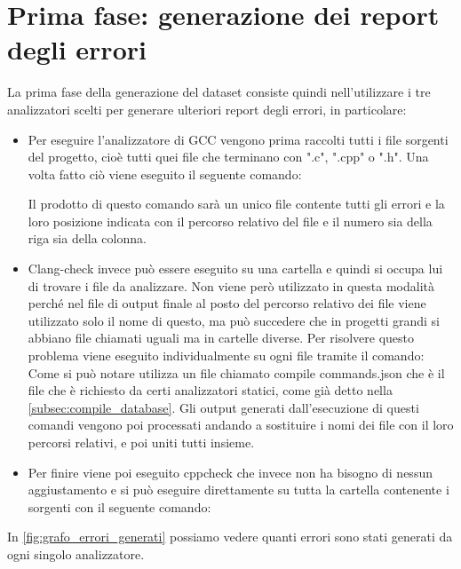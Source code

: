 \section{Prima fase: generazione dei report degli errori}
La prima fase della generazione del dataset consiste quindi nell'utilizzare i tre analizzatori scelti per generare ulteriori report degli errori, in particolare:
    \begin{itemize}
      \item Per eseguire l'analizzatore di GCC vengono prima raccolti tutti i file sorgenti del progetto, cioè tutti quei file che terminano con ".c", ".cpp" o ".h". Una volta fatto ciò viene eseguito il seguente comando:

            Il prodotto di questo comando sarà un unico file contente tutti gli errori e la loro posizione indicata con il percorso relativo del file e il numero sia della riga sia della colonna.
      \item Clang-check invece può essere eseguito su una cartella e quindi si occupa lui di trovare i file da analizzare.
             Non viene però utilizzato in questa modalità perché nel file di output finale al posto del percorso relativo dei file viene utilizzato solo il nome di questo, ma può succedere che in progetti grandi si abbiano file chiamati uguali ma in cartelle diverse.
             Per risolvere questo problema viene eseguito individualmente su ogni file tramite il comando:
            Come si può notare utilizza un file chiamato compile commands.json che è il file che è richiesto da certi analizzatori statici, come già detto nella \autoref{subsec:compile_database}.
            Gli output generati dall'esecuzione di questi comandi vengono poi processati andando a sostituire i nomi dei file con il loro percorsi relativi, e poi uniti tutti insieme. 
      \item Per finire viene poi eseguito cppcheck che invece non ha bisogno di nessun aggiustamento e si può eseguire direttamente su tutta la cartella contenente i sorgenti con il seguente comando:
    \end{itemize}
    In \autoref{fig:grafo_errori_generati} possiamo vedere quanti errori sono stati generati da ogni singolo analizzatore.


